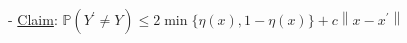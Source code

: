
- \underline{{Claim}}:
$
\mathbb{P}\left(Y^{\prime} \neq Y\right) \leq 2 \min \{\eta(x), 1-\eta(x)\}+c\left\|x-x^{\prime}\right\|
$







